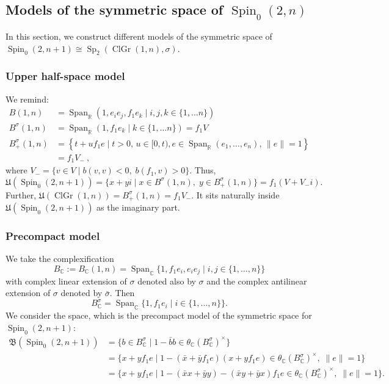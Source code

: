\documentclass[a4paper,oneside,11pt]{amsart}
\DeclareMathOperator{\Span}{Span}
\DeclareMathOperator{\Sp}{Sp}
\DeclareMathOperator{\ClGr}{ClGr}
\DeclareMathOperator{\Spin}{Spin}
\newcommand{\R}{\mathbb R}
\newcommand{\CC}{\mathbb C}
\theoremstyle{plain}
\theoremstyle{definition}
\theoremstyle{remark}
\begin{document}
\subsection{Models of the symmetric space of  \texorpdfstring{$\Spin_0(2,n)$}{Spin0(2,n)}}

In this section, we construct different models of the symmetric space of $\Spin_0(2,n+1)\cong\Sp_2(\ClGr(1,n),\sigma)$.

\subsubsection{Upper half-space model} We remind:
\begin{align*}
    B(1,n)&=\Span_\R(1,e_ie_j,f_1e_k\mid i,j,k\in\{1,\dots n\})\\
    B^{\sigma}(1,n)&=\Span_\R(1,f_1e_k\mid k\in\{1,\dots n\})=f_1V\\
    B^{\sigma}_{+}(1,n)&=\left\{t+uf_1e\mid t>0,\, u\in[0,t), e\in\Span_\R(e_1,\dots,e_n),\, \|e\|=1\right\}\\
    &=f_1V_-\ ,
\end{align*}
where $V_-=\{v\in V\mid b(v,v)<0,\; b(f_1,v)>0\}$. Thus,
$$\mathfrak U(\Spin_0(2,n+1))=\{x+yi\mid x\in B^{\sigma}(1,n),\;y\in B^{\sigma}_+(1,n)\}=f_1(V+V_-i).$$
Further,  $\mathfrak U(\ClGr(1,n))=B^{\sigma}_{+}(1,n)=f_1V_-$. It sits naturally inside $\mathfrak U(\Spin_0(2,n+1))$ as the imaginary part.

\subsubsection{Precompact model}
We take the complexification
$$B_\CC:=B_\CC(1,n)=\Span_\CC\{1,f_1e_i,e_ie_j \mid i,j\in\{1,\dots,n\}\}$$
with complex linear extension of $\sigma$ denoted also by $\sigma$ and the complex antilinear extension of $\sigma$ denoted by $\bar\sigma$. Then
$$B^\sigma_\CC=\Span_\CC\{1,f_1e_i\mid i\in\{1,\dots,n\}\}.$$
We consider the space, which is the precompact model of the symmetric space for $\Spin_0(2,n+1)$:
\begin{align*}
\mathfrak{B}(\Spin_0(2,n+1))&=\{b\in B_\CC^\sigma\mid 1-\bar bb\in \theta_\CC(B^\sigma_\CC)^\times\}\\
&=\{x+yf_1e\mid 1-(\bar x+\bar y f_1e)(x+yf_1e)\in \theta_\CC(B^\sigma_\CC)^\times,\; \|e\|=1\}\\
&=\{x+yf_1e\mid 1-(\bar xx+\bar yy)-(\bar xy+\bar yx)f_1e\in \theta_\CC(B^\sigma_\CC)^\times,\; \|e\|=1\}.
\end{align*}
\end{document}
